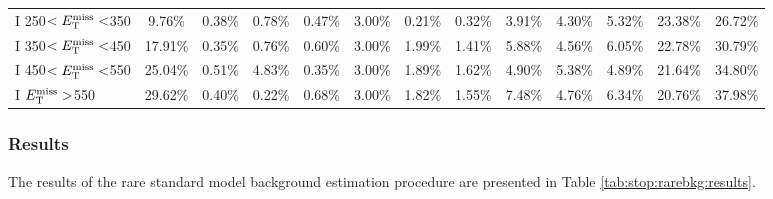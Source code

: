 \begin{table}
\begin{tabular}{|l|ccccccccccc|c|}
 I 250$<E_\text{T}^\text{miss}<$350 & 9.76\%  & 0.38\%  & 0.78\%  & 0.47\%  & 3.00\%  & 0.21\%  & 0.32\%  & 3.91\%  & 4.30\%  & 5.32\%  & 23.38\% & 26.72\% \\
 I 350$<E_\text{T}^\text{miss}<$450 & 17.91\% & 0.35\%  & 0.76\%  & 0.60\%  & 3.00\%  & 1.99\%  & 1.41\%  & 5.88\%  & 4.56\%  & 6.05\%  & 22.78\% & 30.79\% \\
 I 450$<E_\text{T}^\text{miss}<$550 & 25.04\% & 0.51\%  & 4.83\%  & 0.35\%  & 3.00\%  & 1.89\%  & 1.62\%  & 4.90\%  & 5.38\%  & 4.89\%  & 21.64\% & 34.80\% \\
 I $E_\text{T}^\text{miss}>$550     & 29.62\% & 0.40\%  & 0.22\%  & 0.68\%  & 3.00\%  & 1.82\%  & 1.55\%  & 7.48\%  & 4.76\%  & 6.34\%  & 20.76\% & 37.98\% \\
\hline
\end{tabular}
\end{table}

\subsubsection{Results}
\label{sssec:stop:rarebkg:results}

The results of the rare standard model background estimation procedure
are presented in Table \ref{tab:stop:rarebkg:results}.

